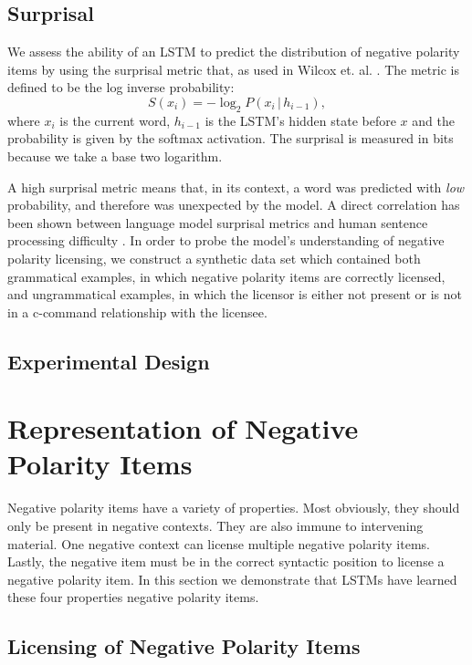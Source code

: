 \documentclass[11pt, round]{article}
\begin{document}
\subsection{Surprisal}

We assess the ability of an LSTM to predict the distribution of negative polarity items by using the surprisal metric that, as used in Wilcox et. al. . The metric is defined to be the log inverse probability:
\[ S(x_i) = -\log_2 P(x_i \, | \, h_{i-1}), \]
where $x_i$ is the current word, $h_{i-1}$ is the LSTM's hidden state before $x$ and the probability is given by the softmax activation. The surprisal is measured in bits because we take a base two logarithm.

A high surprisal metric means that, in its context, a word was predicted with \textit{low} probability, and therefore was unexpected by the model. A direct correlation has been shown between language model surprisal metrics and  human sentence processing difficulty \cite{hale2001probabilistic,levy2008expectation,smith2013effect}. In order to probe the model’s understanding of negative polarity licensing, we construct a synthetic data set which contained both grammatical examples, in which negative polarity items are correctly licensed, and ungrammatical examples, in which the licensor is either not present or is not in a c-command relationship with the licensee.

\subsection{Experimental Design}

\section{Representation of Negative Polarity Items}

Negative polarity items have a variety of properties. Most obviously, they should only be present in negative contexts. They are also immune to intervening material. One negative context can license multiple negative polarity items. Lastly, the negative item must be in the correct syntactic position to license a negative polarity item. In this section we demonstrate that LSTMs have learned these four properties negative polarity items.

\subsection{Licensing of Negative Polarity Items}
\end{document}
